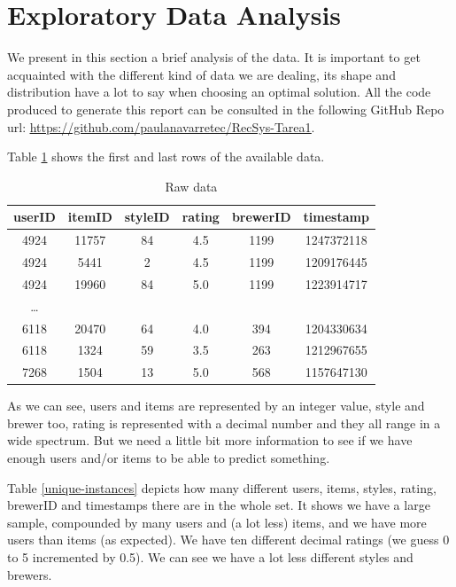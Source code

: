 \documentclass[letterpaper, 10 pt, conference]{ieeeconf}  %
\begin{document}
\section{Exploratory Data Analysis}

We present in this section a brief analysis of the data. It is important to get acquainted with the different kind of data we are dealing, its shape and distribution have a lot to say when choosing an optimal solution.
All the code produced to generate this report can be consulted in the following GitHub Repo url: \underline{\url{https://github.com/paulanavarretec/RecSys-Tarea1}}.


Table \ref{raw-data} shows the first and last rows of the available data. 

\begin{table}[]
\centering
\begin{tabular}{|c|c|c|c|c|c|}
\hline 
\rowcolor[HTML]{DAE8FC} 
userID & itemID & styleID & rating & brewerID & timestamp  \\ \hline \hline
4924   & 11757  & 84      & 4.5    & 1199     & 1247372118 \\ \hline
4924   & 5441   & 2       & 4.5    & 1199     & 1209176445 \\ \hline
4924   & 19960  & 84      & 5.0    & 1199     & 1223914717 \\ \hline
\dots       &        &         &        &          &            \\ \hline
6118   & 20470  & 64      & 4.0    & 394      & 1204330634 \\ \hline
6118   & 1324   & 59      & 3.5    & 263      & 1212967655 \\ \hline
7268   & 1504   & 13      & 5.0    & 568      & 1157647130 \\ \hline
\end{tabular}
\caption{Raw data}
\label{raw-data}
\end{table}

As we can see, users and items are represented by an integer value, style and brewer too, rating is represented with a decimal number and they all range in a wide spectrum. But we need a little bit more information to see if we have enough users and/or items to be able to predict something.

Table \ref{unique-instances} depicts how many different users, items, styles, rating, brewerID and timestamps there are in the whole set. It shows we have a large sample, compounded by many users and (a lot less) items, and we have more users than items (as expected). We have ten different decimal ratings (we guess 0 to 5 incremented by 0.5). We can see we have a lot less different styles and brewers.
\end{document}
